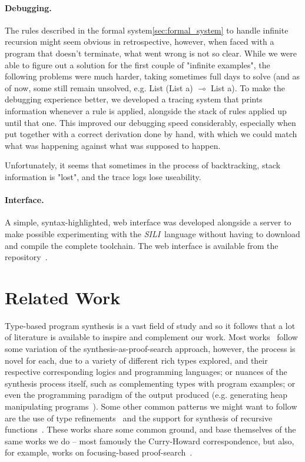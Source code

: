 \documentclass{llncs}
\newcommand{\lolli}{\multimap}
\newcommand{\mypara}[1]{\paragraph{\textbf{#1}.}}
\newcommand{\synname}{\emph{SILI}}
\begin{document}
\mypara{Debugging} The rules described in the formal
system\ref{sec:formal_system} to handle infinite recursion might seem obvious in
retrospective, however, when faced with a program that doesn't terminate, what
went wrong is not so clear. While we were able to figure out a solution for the
first couple of "infinite examples", the following problems were much harder,
taking sometimes full days to solve (and as of now, some still remain unsolved,
e.g. List (List a) $\lolli$ List a). To make the debugging experience better, we
developed a tracing system that prints information whenever a rule is applied,
alongside the stack of rules applied up until that one. This improved our
debugging speed considerably, especially when put together with a correct
derivation done by hand, with which we could match what was happening against
what was supposed to happen.

Unfortunately, it seems that sometimes in the process of backtracking, stack
information is "lost", and the trace logs lose useability.

\mypara{Interface} A simple, syntax-highlighted, web interface was developed
alongside a server to make possible experimenting with the \synname\ 
language without having to download and compile the complete toolchain. The web
interface is available from the repository~\cite{github repo}.





\section{Related Work}

Type-based program synthesis is a vast field of study and so it
follows that a lot of literature is available to inspire and
complement our work. Most works~\cite{DBLP:conf/lopstr/HughesO20,DBLP:conf/pldi/PolikarpovaKS16,DBLP:conf/pldi/OseraZ15,DBLP:conf/popl/FrankleOWZ16} follow some variation of the
synthesis-as-proof-search approach, however, the process is novel for
each, due to a variety of different rich types explored, and their
respective corresponding logics and programming languages; or nuances
of the synthesis process itself, such as complementing types with
program examples; or even the programming paradigm of the output
produced (e.g. generating heap manipulating
programs~\cite{DBLP:journals/pacmpl/PolikarpovaS19}).  Some other
common patterns we might want to follow are the use of type
refinements~\cite{DBLP:conf/pldi/PolikarpovaKS16} and the support for synthesis of recursive
functions~\cite{DBLP:conf/pldi/PolikarpovaKS16,DBLP:conf/pldi/OseraZ15}.  These works share some common ground, and base
themselves of the same works we do -- most famously the Curry-Howard
correspondence, but also, for example, works on focusing-based
proof-search~\cite{10.1093/logcom/2.3.297}.
\end{document}
